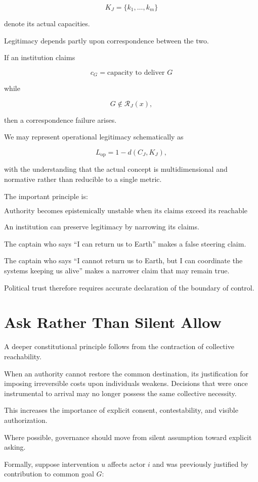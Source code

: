 \documentclass[11pt,oneside]{book}
\theoremstyle{definition}
\theoremstyle{remark}
\newcommand{\R}{\mathcal{R}}
\begin{document}
\[
K_J
=
\{k_1,\ldots,k_m\}
\]

denote its actual capacities.

Legitimacy depends partly upon correspondence between the two.

If an institution claims

\[
c_G=\text{capacity to deliver }G
\]

while

\[
G\notin\R_J(x),
\]

then a correspondence failure arises.

We may represent operational legitimacy schematically as

\[
L_{\mathrm{op}}
=
1-d(C_J,K_J),
\]

with the understanding that the actual concept is multidimensional and normative rather than reducible to a single metric.

The important principle is:

\[
\boxed{
\text{Authority becomes epistemically unstable when its claims exceed its reachable capacities.}
}
\]

An institution can preserve legitimacy by narrowing its claims.

The captain who says ``I can return us to Earth'' makes a false steering claim.

The captain who says ``I cannot return us to Earth, but I can coordinate the systems keeping us alive'' makes a narrower claim that may remain true.

Political trust therefore requires accurate declaration of the boundary of control.

\section{Ask Rather Than Silent Allow}

A deeper constitutional principle follows from the contraction of collective reachability.

When an authority cannot restore the common destination, its justification for imposing irreversible costs upon individuals weakens. Decisions that were once instrumental to arrival may no longer possess the same collective necessity.

This increases the importance of explicit consent, contestability, and visible authorization.

Where possible, governance should move from silent assumption toward explicit asking.

Formally, suppose intervention \(u\) affects actor \(i\) and was previously justified by contribution to common goal \(G\):
\end{document}
